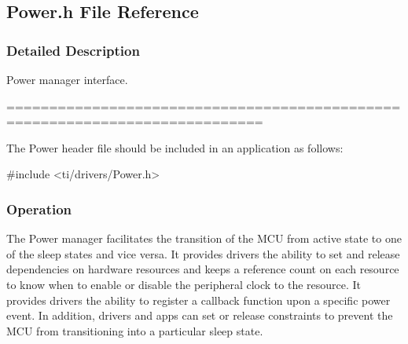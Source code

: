 \subsection{Power.\+h File Reference}
\label{_power_8h}


\subsubsection{Detailed Description}
Power manager interface. 

============================================================================

The Power header file should be included in an application as follows\+: 
\begin{DoxyCode}
\textcolor{preprocessor}{#include <ti/drivers/Power.h>}
\end{DoxyCode}


\subsubsection*{Operation}

The Power manager facilitates the transition of the M\+C\+U from active state to one of the sleep states and vice versa. It provides drivers the ability to set and release dependencies on hardware resources and keeps a reference count on each resource to know when to enable or disable the peripheral clock to the resource. It provides drivers the ability to register a callback function upon a specific power event. In addition, drivers and apps can set or release constraints to prevent the M\+C\+U from transitioning into a particular sleep state. 

